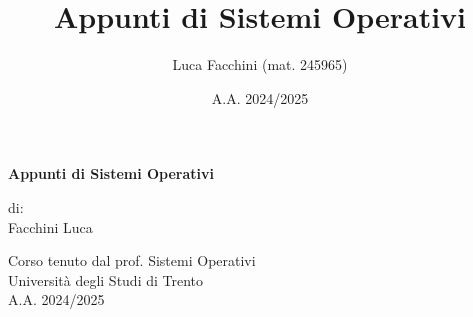 \documentclass[a4paper,twoside]{report}
\title{Appunti di Sistemi Operativi}
\author{Luca Facchini (mat. 245965)}
\date{A.A. 2024/2025}
\begin{document}
    

    \begin{titlepage}
        \centering  %
        {\Huge\textbf{Appunti di Sistemi Operativi}} \\[1cm] %
        \vspace{1.5cm}
        
        {\normalsize di: } \\[.3cm]
        {\Large Facchini Luca} \\ %
        \vspace{1.5cm}
        

        {\normalsize Corso tenuto dal prof. Sistemi Operativi} \\[0.3cm] %
        {\large Università degli Studi di Trento} \\[1.5cm]
        
        {\large A.A. 2024/2025} \\[3cm] %
        

\end{titlepage}
\end{document}
